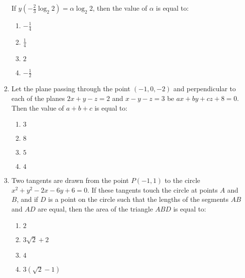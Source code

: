 \documentclass[journal]{IEEEtran}
\numberwithin{figure}{enumi}
\begin{document}
\begin{enumerate}
    If $ y\left(-\frac{2}{3} \log_2 2\right) = \alpha \log_2 2$, then the value of $ \alpha $ is equal to:
    \begin{enumerate}
        \item $ -\frac{1}{4} $
        \item $ \frac{1}{4} $
        \item $ 2 $
        \item $ -\frac{1}{2} $
    \end{enumerate}
    \item Let the plane passing through the point $(-1, 0, -2)$ and perpendicular to each of the planes $2x + y - z = 2$ and $x - y - z = 3$ be $ax + by + cz + 8 = 0$. Then the value of $ a + b + c $ is equal to:
    \begin{enumerate}
        \item $ 3 $
        \item $ 8 $
        \item $ 5 $
        \item $ 4 $
    \end{enumerate}

    \item Two tangents are drawn from the point $P(-1, 1)$ to the circle $x^2 + y^2 - 2x - 6y + 6 = 0$. If these tangents touch the circle at points $A$ and $B$, and if $D$ is a point on the circle such that the lengths of the segments $AB$ and $AD$ are equal, then the area of the triangle $ABD$ is equal to:
    \begin{enumerate}
        \item $ 2 $
        \item $ 3\sqrt{2} + 2 $
        \item $ 4 $
	\item $ 3(\sqrt{2} - 1) $
    \end{enumerate}

  
\end{enumerate}
\end{document}

